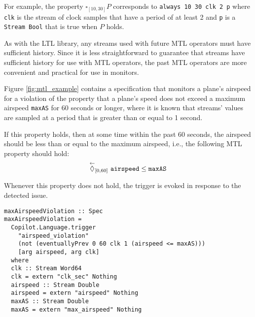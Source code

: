 For example, the property $\square_{[10,30]} P$ corresponds to
\verb,always 10 30 clk 2 p,
where \verb,clk, is the stream of clock samples that have a period of
at least 2 and \verb,p, is a \verb,Stream Bool, that is true when
$P$ holds.


As with the LTL library, any streams used with future MTL operators must
have sufficient history. Since it is less straightforward to guarantee
that streams have sufficient history for use with MTL operators, the past
MTL operators are more convenient and practical for use in monitors.

Figure \ref{fig:mtl_example} contains a specification that monitors a plane's airspeed for a
violation of the property that a plane's speed does not exceed a maximum
airspeed \verb,maxAS, for 60 seconds or longer, where it is known that streams'
values are sampled at a period that is greater than or equal to 1 second.

If this property holds, then at some time within the past 60 seconds,
the airspeed should be less than or equal to the maximum airspeed, i.e.,
the following MTL property should hold:
$$ \overset{\leftarrow}{\lozenge}_{[0,60]}~\mathtt{airspeed} \leq \mathtt{maxAS} $$

Whenever this property does not hold, the trigger is evoked in response to
the detected issue.

\begin{figure*}[!htb]
\begin{lstlisting}[frame=none]
maxAirspeedViolation :: Spec
maxAirspeedViolation =
  Copilot.Language.trigger
    "airspeed_violation"
    (not (eventuallyPrev 0 60 clk 1 (airspeed <= maxAS)))
    [arg airspeed, arg clk]
  where
  clk :: Stream Word64
  clk = extern "clk_sec" Nothing
  airspeed :: Stream Double
  airspeed = extern "airspeed" Nothing
  maxAS :: Stream Double
  maxAS = extern "max_airspeed" Nothing
\end{lstlisting}
\caption{An example use of the MTL library function {\tt eventuallyPrev}.}
\label{fig:mtl_example}
\end{figure*}
